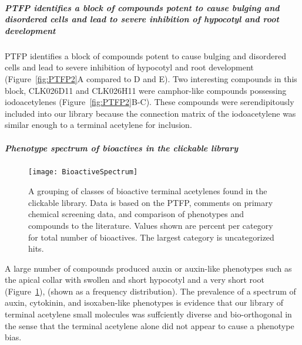 \subsubsection{PTFP identifies a block of compounds potent to cause bulging and disordered cells and lead to severe inhibition of hypocotyl and root development}

PTFP identifies a block of compounds potent to cause bulging and disordered cells and lead to severe inhibition of hypocotyl and root development (Figure~\ref{fig:PTFP2}A compared to D and E). Two interesting compounds in this block, CLK026D11 and CLK026H11 were camphor-like compounds possessing iodoacetylenes (Figure~\ref{fig:PTFP2}B-C). These compounds were serendipitously included into our library because the connection matrix of the iodoacetylene was similar enough to a terminal acetylene for inclusion.

\subsubsection{Phenotype spectrum of bioactives in the clickable library}

\begin{figure}\centering
\texttt{[image: BioactiveSpectrum]}
\caption{A grouping of classes of bioactive terminal acetylenes found in the clickable library. Data is based on the PTFP, comments on primary chemical screening data, and comparison of phenotypes and compounds to the literature. Values shown are percent per category for total number of bioactives. The largest category is uncategorized hits.}
\label{fig:BioactiveSpectrum}
\end{figure}

A large number of compounds produced auxin or auxin-like phenotypes such as the apical collar with swollen and short hypocotyl and a very short root (Figure~\ref{fig:BioactiveSpectrum}), (shown as a frequency distribution). The prevalence of a spectrum of auxin, cytokinin, and isoxaben-like phenotypes is evidence that our library of terminal acetylene small molecules was suffciently diverse and bio-orthogonal in the sense that the terminal acetylene alone did not appear to cause a phenotype bias. 



\part{}

